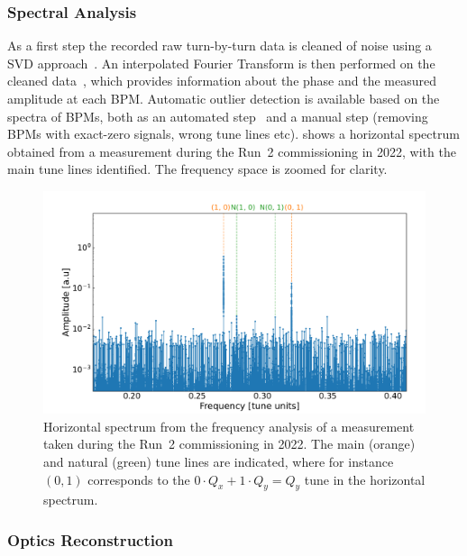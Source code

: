 \subsubsection*{Spectral Analysis}

As a first step the recorded raw turn-by-turn data is cleaned of noise using a \gls{SVD} approach~\cite{PRAB:Calaga:Statistical_Analysis_RHIC_BPMs}.
An interpolated Fourier Transform is then performed on the cleaned data~\cite{PHD:Malina,IPAC:Malina:Harpy_Fast_Simple}, which provides information about the phase and the measured amplitude at each BPM.
Automatic outlier detection is available based on the spectra of BPMs, both as an automated step~\cite{PRAB:Fol:Detection_Faulty_BPMs} and a manual step (removing BPMs with exact-zero signals, wrong tune lines etc).
 shows a horizontal spectrum obtained from a measurement during the Run~\num{2} commissioning in \num{2022}, with the main tune lines identified.
The frequency space is zoomed for clarity.

\begin{figure}[!htb]
  \centering
  \includegraphics*[width=\linewidth]{Figures/Optics_Measurements_Corrections_at_LHC/example_bpm_spectrum.pdf}
  \caption{Horizontal spectrum from the frequency analysis of a measurement taken during the Run~\num{2} commissioning in \num{2022}. The main (\textcolor{mplorange}{orange}) and natural (\textcolor{mplgreen}{green}) tune lines are indicated, where for instance \((0, 1)\) corresponds to the \(0 \cdot Q_x + 1 \cdot Q_y = Q_y\) tune in the horizontal spectrum.}
  \label{figure:example_spectrum}
\end{figure}

\subsubsection*{Optics Reconstruction}

